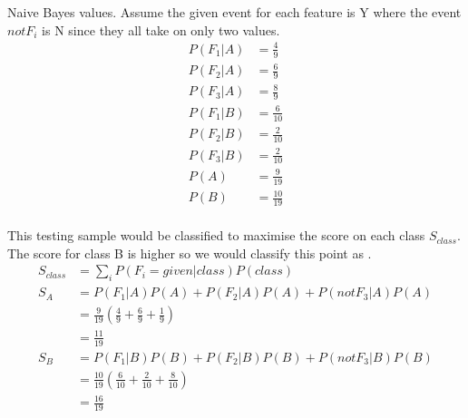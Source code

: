 \documentclass[newpage]{homework}
\begin{document}
\question
Naive Bayes values. Assume the given event for each feature is Y where the event $not F_i$ is N since they all take on only two values.
\begin{align*}
    P(F_1|A)	&=	\frac{4}{9}	\\
    P(F_2|A)	&=	\frac{6}{9}	\\
    P(F_3|A)	&=	\frac{8}{9}	\\
    P(F_1|B)	&=	\frac{6}{10}	\\
    P(F_2|B)	&=	\frac{2}{10}	\\
    P(F_3|B)	&=	\frac{2}{10}	\\
    P(A)  &=  \frac{9}{19}   \\
    P(B)  &=  \frac{10}{19}   \\
\end{align*}

This testing sample would be classified to maximise the score on each class $S_{class}$. The score for class B is higher so we would classify this point as .
\begin{align*}
    S_{class}   &=	\sum_i P(F_i = given|class) P(class)  \\
    S_A    &=	P(F_1|A) P(A) + P(F_2|A) P(A) + P(not F_3|A) P(A)	\\
            &=	\frac{9}{19} \left(\frac{4}{9} + \frac{6}{9} + \frac{1}{9} \right)	\\
            &=  \frac{11}{19}   \\
    S_B    &=	P(F_1|B) P(B) + P(F_2|B) P(B) + P(not F_3|B) P(B)	\\
            &=	\frac{10}{19} \left(\frac{6}{10} + \frac{2}{10} + \frac{8}{10} \right)	\\
            &=  \frac{16}{19}   \\
\end{align*}
\end{document}
